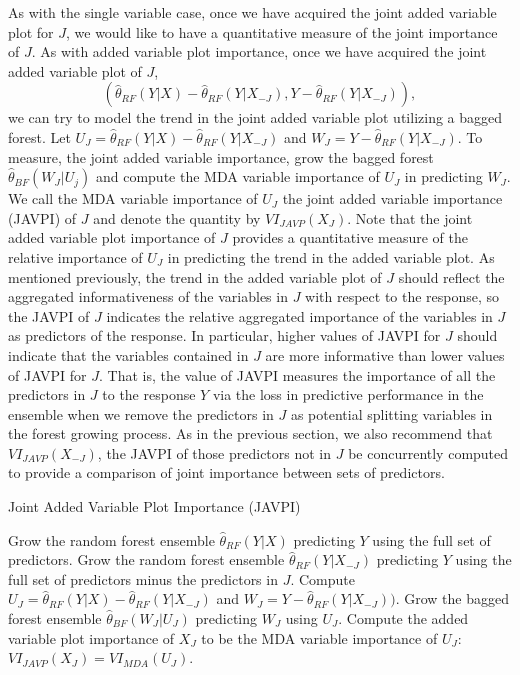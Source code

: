\documentclass[12pt,twoside]{reedthesis}
\theoremstyle{definition}
\theoremstyle{definition}
\theoremstyle{definition}
\theoremstyle{remark}
\begin{document}
As with the single variable case, once we have acquired the joint added
variable plot for \(J\), we would like to have a quantitative measure of
the joint importance of \(J\). As with added variable plot importance,
once we have acquired the joint added variable plot of \(J\),
\[(\hat{\theta}_{RF}(Y|X)-\hat{\theta}_{RF}(Y|X_{-J}), Y-\hat{\theta}_{RF}(Y|X_{-J})),\]
we can try to model the trend in the joint added variable plot utilizing
a bagged forest. Let
\(U_J=\hat{\theta}_{RF}(Y|X)-\hat{\theta}_{RF}(Y|X_{-J})\) and
\(W_J=Y-\hat{\theta}_{RF}(Y|X_{-J})\). To measure, the joint added
variable importance, grow the bagged forest
\(\hat{\theta}_{BF}(W_J|U_j)\) and compute the MDA variable importance
of \(U_J\) in predicting \(W_J\). We call the MDA variable importance of
\(U_J\) the joint added variable importance (JAVPI) of \(J\) and denote
the quantity by \(VI_{JAVP}(X_J)\). Note that the joint added variable
plot importance of \(J\) provides a quantitative measure of the relative
importance of \(U_J\) in predicting the trend in the added variable
plot. As mentioned previously, the trend in the added variable plot of
\(J\) should reflect the aggregated informativeness of the variables in
\(J\) with respect to the response, so the JAVPI of \(J\) indicates the
relative aggregated importance of the variables in \(J\) as predictors
of the response. In particular, higher values of JAVPI for \(J\) should
indicate that the variables contained in \(J\) are more informative than
lower values of JAVPI for \(J\). That is, the value of JAVPI measures
the importance of all the predictors in \(J\) to the response \(Y\) via
the loss in predictive performance in the ensemble when we remove the
predictors in \(J\) as potential splitting variables in the forest
growing process. As in the previous section, we also recommend that
\(VI_{JAVP}(X_{-J})\), the JAVPI of those predictors not in \(J\) be
concurrently computed to provide a comparison of joint importance
between sets of predictors.
\begin{algorithm}
    \caption{Joint Added Variable Plot Importance (JAVPI)} \label{added variable importance}
      \begin{algorithmic}[1]
          \State Grow the random forest ensemble $\hat{\theta}_{RF}(Y|X)$ predicting $Y$ using the full set of predictors.
          \State Grow the random forest ensemble $\hat{\theta}_{RF}(Y|X_{-J})$ predicting $Y$ using the full set of predictors minus the predictors in $J$.
          \State Compute $U_J=\hat{\theta}_{RF}(Y|X)-\hat{\theta}_{RF}(Y|X_{-J})$ and $W_J=Y-\hat{\theta}_{RF}(Y|X_{-J})).$
          \State Grow the bagged forest ensemble $\hat{\theta}_{BF}(W_J|U_J)$ predicting $W_J$ using $U_J$. 
          \State Compute the added variable plot importance of $X_J$ to be the MDA variable importance of $U_J$: $VI_{JAVP}(X_J)=VI_{MDA}(U_J)$.
          
      \end{algorithmic}
  \end{algorithm}
\end{document}
